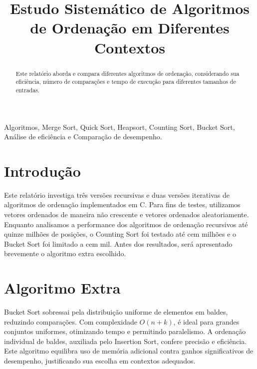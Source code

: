 \documentclass[conference]{IEEEtran}
\begin{document}
\title{Estudo Sistemático de Algoritmos de Ordenação em Diferentes Contextos}

\author{}

\maketitle

\begin{abstract}
Este relatório aborda e compara diferentes algoritmos de ordenação, considerando sua eficiência, número de comparações e tempo de execução para diferentes tamanhos de entradas.
\end{abstract}

\begin{IEEEkeywords}
Algoritmos, Merge Sort, Quick Sort, Heapsort, Counting Sort, Bucket Sort, Análise de eficiência e Comparação de desempenho.
\end{IEEEkeywords}

\vspace{-0.2cm}
\section{Introdução}
Este relatório investiga três versões recursivas e duas versões iterativas de algoritmos de ordenação implementados em C. Para fins de testes, utilizamos vetores ordenados de maneira não crescente e vetores ordenados aleatoriamente. Enquanto analisamos a performance dos algoritmos de ordenação recursivos até quinze milhões de posições, o Counting Sort foi testado até cem milhões e o Bucket Sort foi limitado a cem mil. Antes dos resultados, será apresentado brevemente o algoritmo extra escolhido.


\section{Algoritmo Extra}
Bucket Sort sobressai pela distribuição uniforme de elementos em baldes, reduzindo comparações. Com complexidade \( O(n + k) \), é ideal para grandes conjuntos uniformes, otimizando tempo e permitindo paralelismo. A ordenação individual de baldes, auxiliada pelo Insertion Sort, confere precisão e eficiência. Este algoritmo equilibra uso de memória adicional contra ganhos significativos de desempenho, justificando sua escolha em contextos adequados.
\end{document}
